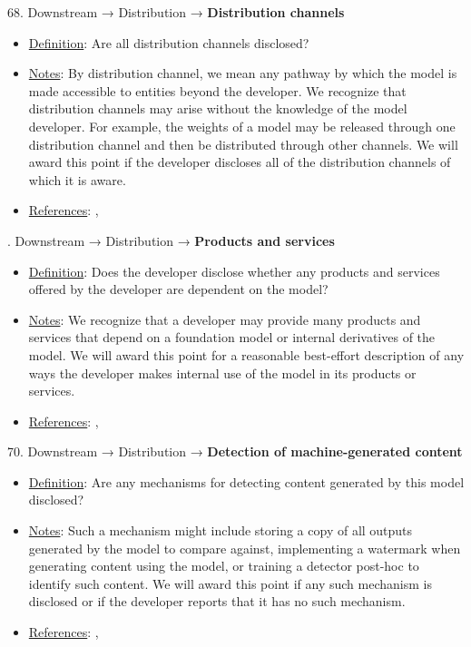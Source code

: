 68. Downstream → Distribution → \textbf{Distribution channels}
\vspace{-\parskip}
\begin{itemize}
\item
\underline{Definition}: Are all distribution channels disclosed?
\item
\underline{Notes}: By distribution channel, we mean any pathway by which the model is made accessible to entities beyond the developer. We recognize that distribution channels may arise without the knowledge of the model developer. For example, the weights of a model may be released through one distribution channel and then be distributed through other channels. We will award this point if the developer discloses all of the distribution channels of which it is aware.
\item
\underline{References}: \citet{cobbe2023supply}, \citet{widder2023thinking}
\end{itemize} \vspace{\baselineskip}


. Downstream → Distribution → \textbf{Products and services}
\vspace{-\parskip}
\begin{itemize}
\item
\underline{Definition}: Does the developer disclose whether any products and services offered by the developer are dependent on the model?
\item
\underline{Notes}: We recognize that a developer may provide many products and services that depend on a foundation model or internal derivatives of the model. We will award this point for a reasonable best-effort description of any ways the developer makes internal use of the model in its products or services.
\item
\underline{References}: \citet{cobbe2023supply}, \citet{cen2023supplychain}
\end{itemize} \vspace{\baselineskip}


70. Downstream → Distribution → \textbf{Detection of machine-generated content}
\vspace{-\parskip}
\begin{itemize}
\item
\underline{Definition}: Are any mechanisms for detecting content generated by this model disclosed?
\item
\underline{Notes}: Such a mechanism might include storing a copy of all outputs generated by the model to compare against, implementing a watermark when generating content using the model, or training a detector post-hoc to identify such content. We will award this point if any such mechanism is disclosed or if the developer reports that it has no such mechanism.
\item
\underline{References}: \citet{kirchenbauer2023watermark}, \citet{Kuditipudi2023RobustDW}
\end{itemize} \vspace{\baselineskip}


